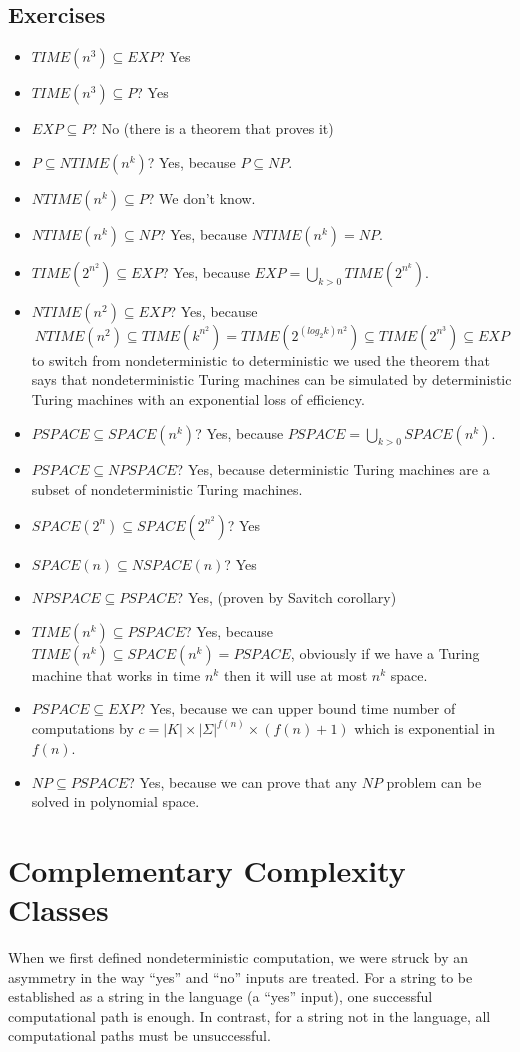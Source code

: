 \documentclass[12pt]{article}
\begin{document}
\subsection{Exercises}
\begin{itemize}
  \item $TIME(n^3)\subseteq EXP$? Yes
  \item $TIME(n^3)\subseteq P$? Yes
  \item $EXP\subseteq P$? No (there is a theorem that proves it)
  \item $P\subseteq NTIME(n^k)$? Yes, because $P\subseteq NP$.
  \item $NTIME(n^k)\subseteq P$? We don't know.
  \item $NTIME(n^k)\subseteq NP$? Yes, because $NTIME(n^k)=NP$.
  \item $TIME(2^{n^2})\subseteq EXP$? Yes, because $EXP = \bigcup\limits_{k > 0} TIME(2^{n^k})$.
  \item $NTIME(n^2)\subseteq EXP$? Yes, because 
  $$NTIME(n^2)\subseteq TIME(k^{n^2})=TIME(2^{(log_2k)n^2})\subseteq TIME(2^{n^3})\subseteq EXP$$ to switch from nondeterministic to deterministic we used the theorem that says that nondeterministic Turing machines can be simulated by deterministic Turing machines with an exponential loss of efficiency.
  \item $PSPACE\subseteq SPACE(n^k)$? Yes, because $PSPACE = \bigcup\limits_{k > 0} SPACE(n^k)$.
  \item $PSPACE\subseteq NPSPACE$? Yes, because deterministic Turing machines are a subset of nondeterministic Turing machines.
  \item $SPACE(2^n)\subseteq SPACE(2^{n^2})$? Yes
  \item $SPACE(n)\subseteq NSPACE(n)$? Yes
  \item $NPSPACE\subseteq PSPACE$? Yes, (proven by Savitch corollary)
  \item $TIME(n^k)\subseteq PSPACE$? Yes, because $TIME(n^k)\subseteq SPACE(n^k) = PSPACE$, obviously if we have a Turing machine that works in time $n^k$ then it will use at most $n^k$ space.
  \item $PSPACE\subseteq EXP$? Yes, because we can upper bound time number of computations by $c= |K|\times|\Sigma|^{f(n)}\times (f(n)+1)$ which is exponential in $f(n)$.
  \item $NP\subseteq PSPACE$? Yes, because we can prove that any $NP$ problem can be solved in polynomial space.
\end{itemize}
\section{Complementary Complexity Classes}
When we first defined nondeterministic computation, we were struck by an asymmetry in the way ``yes'' and ``no'' inputs are treated. For a string to be established as a string in the language (a ``yes'' input), one successful computational path is enough. In contrast, for a string not in the language, all computational paths must be unsuccessful. 
\end{document}
